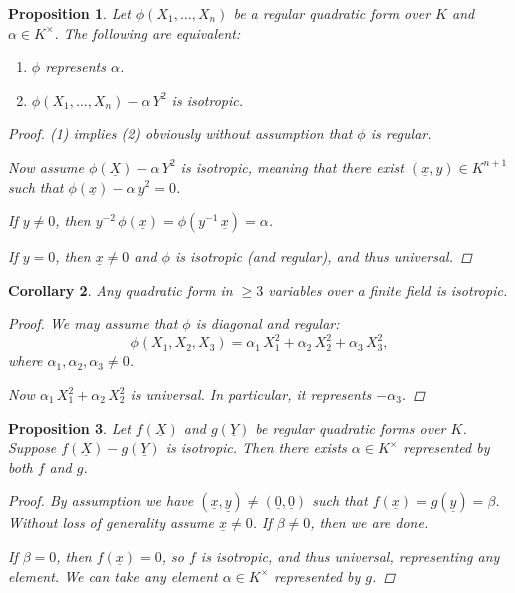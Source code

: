 \documentclass{article}
\theoremstyle{myplain}
\newtheorem{proposition}{Proposition}[section]
\newtheorem{corollary}[proposition]{Corollary}
\theoremstyle{mydefinition}
\begin{document}
\begin{proposition}
  Let $\phi (X_1,\ldots,X_n)$ be a regular quadratic form over $K$ and
  $\alpha \in K^\times$. The following are equivalent:
  \begin{enumerate}
  \item $\phi$ represents $\alpha$.

  \item $\phi (X_1,\ldots,X_n) - \alpha \, Y^2$ is isotropic.
  \end{enumerate}

  \begin{proof}
    (1) implies (2) obviously without assumption that $\phi$ is regular.

    Now assume $\phi (\underline{X}) - \alpha \, Y^2$ is isotropic, meaning that
    there exist $(\underline{x}, y) \in K^{n+1}$ such that
    $\phi (\underline{x}) - \alpha \, y^2 = 0$.

    If $y \ne 0$, then
    $y^{-2}\,\phi (\underline{x}) = \phi (y^{-1}\,\underline{x}) = \alpha$.

    If $y = 0$, then $\underline{x} \ne 0$ and $\phi$ is isotropic (and
    regular), and thus universal.
  \end{proof}
\end{proposition}

\begin{corollary}
  Any quadratic form in $\ge 3$ variables over a finite field is isotropic.

  \begin{proof}
    We may assume that $\phi$ is diagonal and regular:
    $$\phi (X_1,X_2,X_3) = \alpha_1\,X_1^2 + \alpha_2\,X_2^2 + \alpha_3\,X_3^2,$$
    where $\alpha_1,\alpha_2,\alpha_3 \ne 0$.

    Now $\alpha_1\,X_1^2 + \alpha_2\,X_2^2$ is universal. In particular, it
    represents $-\alpha_3$.
  \end{proof}
\end{corollary}

\begin{proposition}\label{proposition:form-difference-isotropic}
  Let $f (\underline{X})$ and $g (\underline{Y})$ be regular quadratic forms
  over $K$. Suppose $f (\underline{X}) - g (\underline{Y})$ is isotropic. Then
  there exists $\alpha \in K^\times$ represented by both $f$ and $g$.

  \begin{proof}
    By assumption we have
    $(\underline{x},\underline{y}) \ne (\underline{0},\underline{0})$ such that
    $f (\underline{x}) = g (\underline{y}) = \beta$. Without loss of generality
    assume $\underline{x} \ne 0$. If $\beta \ne 0$, then we are done.

    If $\beta = 0$, then $f (\underline{x}) = 0$, so $f$ is isotropic, and thus
    universal, representing any element. We can take any element
    $\alpha \in K^\times$ represented by $g$.
  \end{proof}
\end{proposition}
\end{document}
